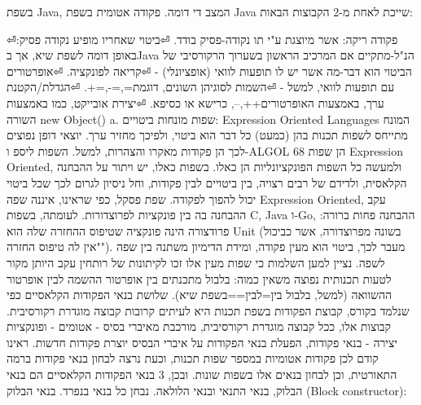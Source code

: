         בשפת Java, המצב די דומה. פקודה אטומית בשפת Java שייכת לאחת מ-2 הקבוצות הבאות:
        \begin{ציינון}
⏎פקודה ריקה: אשר מיוצגת ע"י תו נקודה-פסיק בודד.
⏎ביטוי שאחריו מופיע נקודה פסיק: באופן דומה לשפת שיא, אך בJava הנ"ל-מתקיים אם המרכיב הראשון בשערוך הרקורסיבי של הביטוי הוא דבר-מה אשר יש לו תופעות לוואי (אופציונלי) -
⏎קריאה לפונקציה.
⏎אופרטורים עם תופעות לוואי, למשל -
⏎השמות לסוגיהן השונים, דוגמת=,=-,=+.
⏎הגדלת/הקטנת ערך, באמצעות האופרטורים++,--, כרישא או כסיפא.
⏎יצירת אובייקט, כמו באמצעות השורה new Object() a.
        שפות מונחות ביטויים: Expression Oriented Languages
        המונח מתייחס לשפות תכנות בהן (כמעט) כל דבר הוא ביטוי, ולפיכך מחזיר ערך. יוצאי דופן נפוצים לכך הן פקודות מאקרו והצהרות, למשל. השפות ליספ ו-ALGOL 68 הן שפות Expression Oriented, ולמעשה כל השפות הפונקציונליות הן כאלו. בשפות כאלו, יש ויתור על ההבחנה הקלאסית, ולדידם של רבים רצויה, בין ביטויים לבין פקודות, וחל ניסיון לגרום לכך שכל ביטוי יכול להפוך לפקודה.
        שפת פסקל, כפי שראינו, איננה שפה Expression Oriented, עקב ההבחנה בה בין פונקציות לפרוצדורות. לעומתה, בשפות C, Java ו-Go, ההבחנה פחות ברורה: פרודצורה הינה פונקציה שטיפוס ההחזרה שלה הוא Unit (בשונה מפרוצדורה, אשר כביכול "אין לה טיפוס החזרה"). מעבר לכך, ביטוי הוא מעין פקודה, ומידת הדימיון משתנה בין שפה לשפה.
        נציין למען השלמות כי שפות מעין אלו זכו לקיתונות של רותחין עקב היותן מקור לטעות תכנותית נפוצה משאין כמוה: בלבול מתכנתים בין אופרטור ההשמה לבין אופרטור ההשוואה (למשל, בלבול בין=לבין==בשפת שיא).
        שלושת בנאי הפקודות הקלאסיים
        כפי שנלמד בקורס, קבוצת הפקודות בשפת תכנות היא לעיתים קרובות קבוצה מוגדרת רקורסיבית. קבוצות אלו, ככל קבוצה מוגדרת רקורסיבית, מורכבת מאיברי בסיס - אטומים - ופונקציות יצירה - בנאי פקודות, הפעלת בנאי הפקודות על איברי הבסיס יוצרת פקודות חדשות. ראינו קודם לכן פקודות אטומיות במספר שפות תכנות, וכעת נרצה לבחון בנאי פקודות ברמה התאורטית, וכן לבחון בנאים אלו בשפות שונות. ובכן, 3 בנאי הפקודות הקלאסיים הם בנאי הבלוק, בנאי התנאי ובנאי הלולאה. נבחן כל בנאי בנפרד.
        בנאי הבלוק (Block constructor):
    \end{ציינון}

